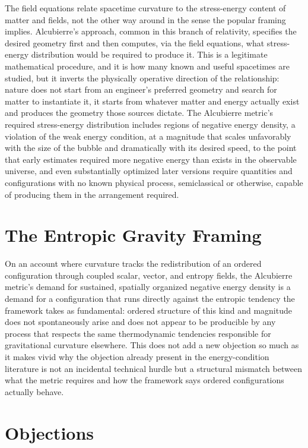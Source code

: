 \documentclass[11pt]{article}
\begin{document}
The field equations relate spacetime curvature to the stress-energy content of matter and fields, not the other way around in the sense the popular framing implies. Alcubierre's approach, common in this branch of relativity, specifies the desired geometry first and then computes, via the field equations, what stress-energy distribution would be required to produce it. This is a legitimate mathematical procedure, and it is how many known and useful spacetimes are studied, but it inverts the physically operative direction of the relationship: nature does not start from an engineer's preferred geometry and search for matter to instantiate it, it starts from whatever matter and energy actually exist and produces the geometry those sources dictate. The Alcubierre metric's required stress-energy distribution includes regions of negative energy density, a violation of the weak energy condition, at a magnitude that scales unfavorably with the size of the bubble and dramatically with its desired speed, to the point that early estimates required more negative energy than exists in the observable universe, and even substantially optimized later versions require quantities and configurations with no known physical process, semiclassical or otherwise, capable of producing them in the arrangement required.

\section{The Entropic Gravity Framing}

On an account where curvature tracks the redistribution of an ordered configuration through coupled scalar, vector, and entropy fields, the Alcubierre metric's demand for sustained, spatially organized negative energy density is a demand for a configuration that runs directly against the entropic tendency the framework takes as fundamental: ordered structure of this kind and magnitude does not spontaneously arise and does not appear to be producible by any process that respects the same thermodynamic tendencies responsible for gravitational curvature elsewhere. This does not add a new objection so much as it makes vivid why the objection already present in the energy-condition literature is not an incidental technical hurdle but a structural mismatch between what the metric requires and how the framework says ordered configurations actually behave.

\section{Objections}
\end{document}
